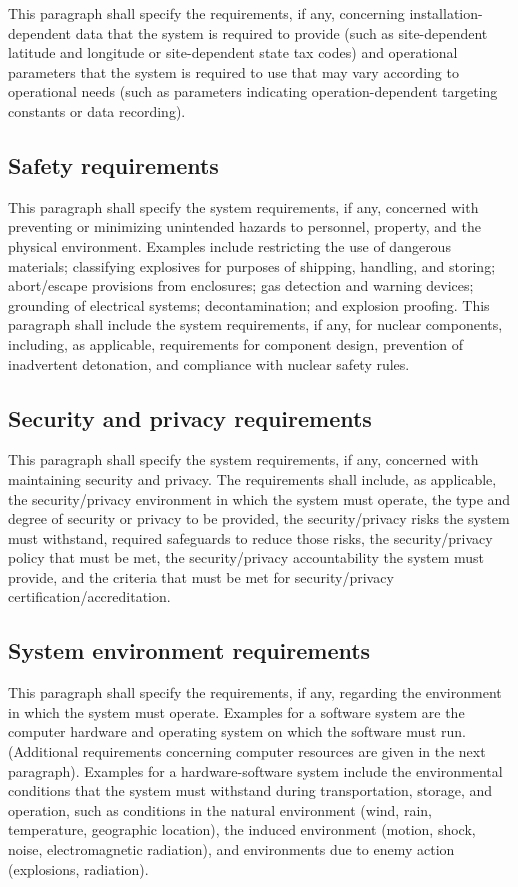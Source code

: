 This paragraph shall specify the requirements, if any, concerning
installation-dependent data that the system is required to provide (such
as site-dependent latitude and longitude or site-dependent state tax
codes) and operational parameters that the system is required to use
that may vary according to operational needs (such as parameters
indicating operation-dependent targeting constants or data recording).

\subsection{Safety requirements}

This paragraph shall specify the system requirements, if any, concerned
with preventing or minimizing unintended hazards to personnel, property,
and the physical environment. Examples include restricting the use of
dangerous materials; classifying explosives for purposes of shipping,
handling, and storing; abort/escape provisions from enclosures; gas
detection and warning devices; grounding of electrical systems;
decontamination; and explosion proofing. This paragraph shall include
the system requirements, if any, for nuclear components, including, as
applicable, requirements for component design, prevention of inadvertent
detonation, and compliance with nuclear safety rules.

\subsection{Security and privacy requirements}

This paragraph shall specify the system requirements, if any, concerned
with maintaining security and privacy. The requirements shall include,
as applicable, the security/privacy environment in which the system must
operate, the type and degree of security or privacy to be provided, the
security/privacy risks the system must withstand, required safeguards to
reduce those risks, the security/privacy policy that must be met, the
security/privacy accountability the system must provide, and the
criteria that must be met for security/privacy
certification/accreditation.

\subsection{System environment requirements}

This paragraph shall specify the requirements, if any, regarding the
environment in which the system must operate. Examples for a software
system are the computer hardware and operating system on which the
software must run. (Additional requirements concerning computer
resources are given in the next paragraph). Examples for a
hardware-software system include the environmental conditions that the
system must withstand during transportation, storage, and operation,
such as conditions in the natural environment (wind, rain, temperature,
geographic location), the induced environment (motion, shock, noise,
electromagnetic radiation), and environments due to enemy action
(explosions, radiation).

